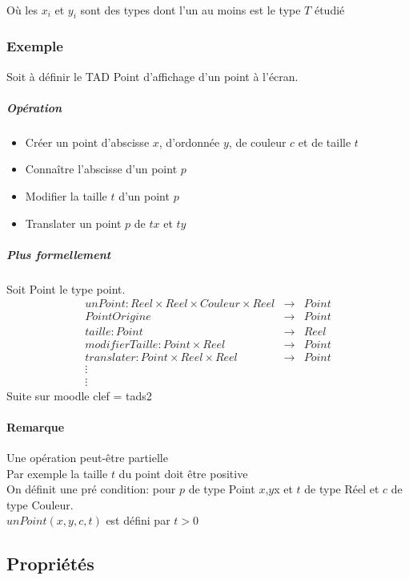 		\paragraph{} Où les $x_{i}$ et $y_{i}$ sont des types dont l'un au moins est le type $T$ étudié
		\subsubsection{Exemple}
			Soit à définir le TAD Point d'affichage d'un point à l'écran.\\
			\subparagraph{Opération} 	
				\begin{itemize}
					\item Créer un point d'abscisse $x$, d'ordonnée $y$, de couleur $c$ et de taille $t$
					\item Connaître l'abscisse d'un point $p$
					\item Modifier la taille $t$ d'un point $p$
					\item Translater un point $p$ de $tx$ et $ty$
				\end{itemize}
			\subparagraph{Plus formellement}
				Soit Point le type point.
				\begin{eqnarray*}
					unPoint: Reel \times Reel \times Couleur \times Reel &\rightarrow& Point\\
					PointOrigine &\rightarrow& Point \\
					taille : Point &\rightarrow& Reel \\
					modifierTaille : Point \times Reel &\rightarrow& Point \\
					translater : Point \times Reel \times Reel &\rightarrow& Point\\
					\vdots \\ \vdots
				\end{eqnarray*}	
					Suite sur moodle clef = tads2
		\paragraph{Remarque}
			Une opération peut-être partielle\\
			Par exemple la taille $t$ du point doit être positive \\
			On définit une pré condition: pour $p$ de type Point $x$,$y$x et $t$ de type Réel et $c$ de type Couleur.\\
			$unPoint(x,y,c,t)$ est défini par $t > 0$
	\subsection{Propriétés}
